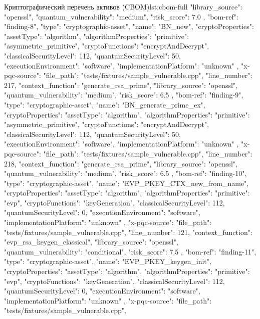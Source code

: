 \documentclass{itmo-vkr}
\begin{document}
\begin{itmolisting}[JSON]{Криптографический перечень активов (CBOM)}{lst:cbom-full}
{{{				"library_source": "openssl",
				"quantum_vulnerability": "medium",
				"risk_score": 7.0
			}
		},
		{
			"bom-ref": "finding-8",
			"type": "cryptographic-asset",
			"name": "BN_new",
			"cryptoProperties": {
				"assetType": "algorithm",
				"algorithmProperties": {
					"primitive": "asymmetric_primitive",
					"cryptoFunctions": "encryptAndDecrypt",
					"classicalSecurityLevel": 112,
					"quantumSecurityLevel": 50,
					"executionEnvironment": "software",
					"implementationPlatform": "unknown"
				}
			},
			"x-pqc-source": {
				"file_path": "tests/fixtures/sample_vulnerable.cpp",
				"line_number": 217,
				"context_function": "generate_rsa_prime",
				"library_source": "openssl",
				"quantum_vulnerability": "medium",
				"risk_score": 6.5
			}
		},
		{
			"bom-ref": "finding-9",
			"type": "cryptographic-asset",
			"name": "BN_generate_prime_ex",
			"cryptoProperties": {
				"assetType": "algorithm",
				"algorithmProperties": {
					"primitive": "asymmetric_primitive",
					"cryptoFunctions": "encryptAndDecrypt",
					"classicalSecurityLevel": 112,
					"quantumSecurityLevel": 50,
					"executionEnvironment": "software",
					"implementationPlatform": "unknown"
				}
			},
			"x-pqc-source": {
				"file_path": "tests/fixtures/sample_vulnerable.cpp",
				"line_number": 218,
				"context_function": "generate_rsa_prime",
				"library_source": "openssl",
				"quantum_vulnerability": "medium",
				"risk_score": 6.5
			}
		},
		{
			"bom-ref": "finding-10",
			"type": "cryptographic-asset",
			"name": "EVP_PKEY_CTX_new_from_name",
			"cryptoProperties": {
				"assetType": "algorithm",
				"algorithmProperties": {
					"primitive": "evp",
					"cryptoFunctions": "keyGeneration",
					"classicalSecurityLevel": 112,
					"quantumSecurityLevel": 0,
					"executionEnvironment": "software",
					"implementationPlatform": "unknown"
				}
			},
			"x-pqc-source": {
				"file_path": "tests/fixtures/sample_vulnerable.cpp",
				"line_number": 121,
				"context_function": "evp_rsa_keygen_classical",
				"library_source": "openssl",
				"quantum_vulnerability": "conditional",
				"risk_score": 7.5
			}
		},
		{
			"bom-ref": "finding-11",
			"type": "cryptographic-asset",
			"name": "EVP_PKEY_keygen_init",
			"cryptoProperties": {
				"assetType": "algorithm",
				"algorithmProperties": {
					"primitive": "evp",
					"cryptoFunctions": "keyGeneration",
					"classicalSecurityLevel": 112,
					"quantumSecurityLevel": 0,
					"executionEnvironment": "software",
					"implementationPlatform": "unknown"
				}
			},
			"x-pqc-source": {
				"file_path": "tests/fixtures/sample_vulnerable.cpp",
}}}
\end{itmolisting}
\end{document}
